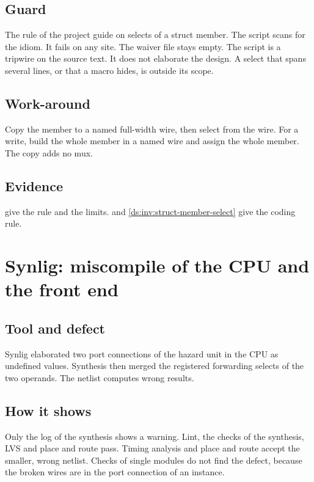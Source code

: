 \subsection*{Guard}
The rule of the project guide on selects of a struct member. The script  scans  for the idiom. It fails on any site. The waiver file  stays empty. The script is a tripwire on the source text. It does not elaborate the design. A select that spans several lines, or that a macro hides, is outside its scope.

\subsection*{Work-around}
Copy the member to a named full-width wire, then select from the wire. For a write, build the whole member in a named wire and assign the whole member. The copy adds no mux.

\subsection*{Evidence}
 give the rule and the limits.  and \cref{ds:inv:struct-member-select} give the coding rule.

\section{Synlig: miscompile of the CPU and the front end}\label{tm:defect:synlig-cpu-miscompile}
\subsection*{Tool and defect}
Synlig elaborated two port connections of the hazard unit in the CPU as undefined values. Synthesis then merged the registered forwarding selects of the two operands. The netlist computes wrong results.

\subsection*{How it shows}
Only the log of the synthesis shows a warning. Lint, the checks of the synthesis, LVS and place and route pass. Timing analysis and place and route accept the smaller, wrong netlist. Checks of single modules do not find the defect, because the broken wires are in the port connection of an instance.

